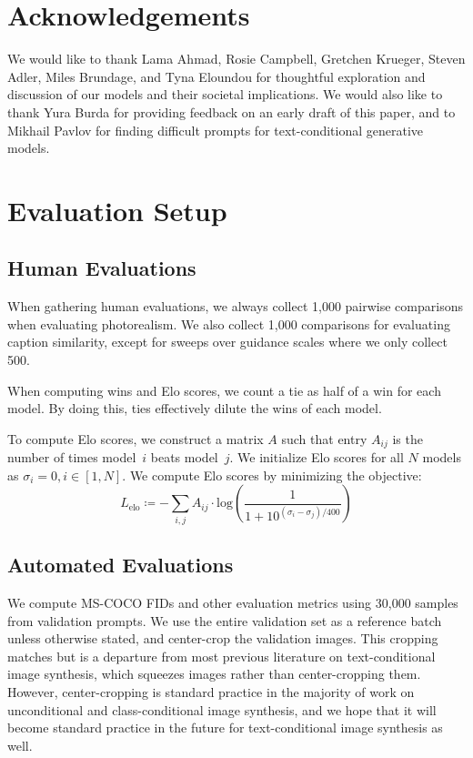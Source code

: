 \documentclass{article}
\begin{document}
\section{Acknowledgements}
\label{sec:acknowledgements}

We would like to thank Lama Ahmad, Rosie Campbell, Gretchen Krueger, Steven Adler, Miles Brundage, and Tyna Eloundou for thoughtful exploration and discussion of our models and their societal implications. We would also like to thank Yura Burda for providing feedback on an early draft of this paper, and to Mikhail Pavlov for finding difficult prompts for text-conditional generative models.





\clearpage

\appendix

\section{Evaluation Setup}

\subsection{Human Evaluations}
\label{app:human_evals}

When gathering human evaluations, we always collect 1,000 pairwise comparisons when evaluating photorealism. We also collect 1,000 comparisons for evaluating caption similarity, except for sweeps over guidance scales where we only collect 500.

When computing wins and Elo scores, we count a tie as half of a win for each model. By doing this, ties effectively dilute the wins of each model.

To compute Elo scores, we construct a matrix $A$ such that entry $A_{ij}$ is the number of times model~$i$ beats model~$j$. We initialize Elo scores for all $N$ models as $\sigma_i = 0, i \in [1,N]$. We compute Elo scores by minimizing the objective:
$$L_{\textrm{elo}} \coloneqq - \sum_{i,j} A_{ij} \cdot \textrm{log}\left(\frac{1}{1+10^{(\sigma_i - \sigma_j)/400}}\right)$$

\subsection{Automated Evaluations}

We compute MS-COCO FIDs and other evaluation metrics using 30,000 samples from validation prompts. We use the entire validation set as a reference batch unless otherwise stated, and center-crop the validation images. This cropping matches \citet{dalle} but is a departure from most previous literature on text-conditional image synthesis, which squeezes images rather than center-cropping them. However, center-cropping is standard practice in the majority of work on unconditional and class-conditional image synthesis, and we hope that it will become standard practice in the future for text-conditional image synthesis as well.
\end{document}
